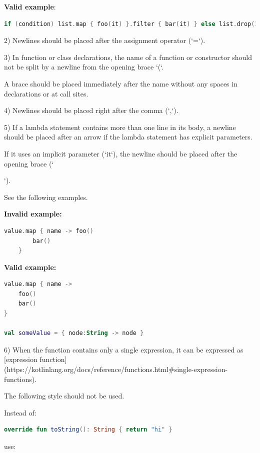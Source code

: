 {\textbf{Valid example}:

\begin{lstlisting}[language=Kotlin]
if (condition) list.map { foo(it) }.filter { bar(it) } else list.drop(1)
\end{lstlisting}


2)	Newlines should be placed after the assignment operator (`=`).

3)	In function or class declarations, the name of a function or constructor should not be split by a newline from the opening brace `(`.

    A brace should be placed immediately after the name without any spaces in declarations or at call sites.

4)	Newlines should be placed right after the comma (`,`).

5)	If a lambda statement contains more than one line in its body, a newline should be placed after an arrow if the lambda statement has explicit parameters.

    If it uses an implicit parameter (`it`), the newline should be placed after the opening brace (`{`).

    See the following examples.





\textbf{Invalid example:}

\begin{lstlisting}[language=Kotlin]
    value.map { name -> foo()
        bar()
    }
\end{lstlisting}


\textbf{Valid example:}

\begin{lstlisting}[language=Kotlin]
value.map { name ->
    foo()
    bar()
}

val someValue = { node:String -> node }
\end{lstlisting}


6) When the function contains only a single expression, it can be expressed as [expression function](https://kotlinlang.org/docs/reference/functions.html\#single-expression-functions).

   The following style should not be used.



Instead of:

\begin{lstlisting}[language=Kotlin]
override fun toString(): String { return "hi" }
\end{lstlisting}
use:

}}
